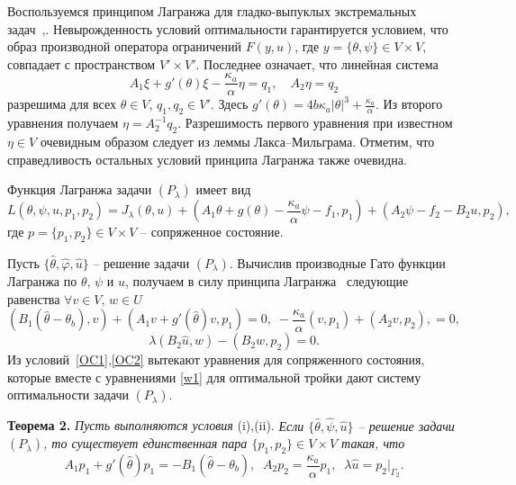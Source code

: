 \documentclass[12pt]{article}
\begin{document}
    Воспользуемся принципом
    Лагранжа для гладко-выпуклых экстремальных задач~\cite{10},\cite{11}. Невырожденность условий оптимальности гарантируется условием, что
    образ производной
    оператора ограничений $F(y, u)$, где $y=\{\theta,\psi\}\in V\times V$,
    совпадает с пространством $V'\times V'.$  Последнее означает, что
    линейная система
    \[
        A_1\xi+g'(\theta)\xi-\frac{\kappa_a}{\alpha}\eta=q_1,\quad
        A_2\eta=q_2
    \]
    разрешима для всех $\theta\in V$, $q_1,q_2\in V'$.
    Здесь $g'(\theta)=4b\kappa_a|\theta|^3+\frac{\kappa_a}{\alpha}$.
    Из второго уравнения получаем $\eta=A_2^{-1}q_2$.
    Разрешимость первого уравнения при известном $\eta\in V$ очевидным образом следует из
    леммы Лакса--Мильграма.
    Отметим, что справедливость остальных условий принципа Лагранжа также очевидна.

    Функция Лагранжа задачи $(P_\lambda)$
    имеет вид
    \[
        L(\theta, \psi, u, p_1, p_2) = J_\lambda(\theta, u)
        + (A_1\theta+g(\theta)-\frac{\kappa_a}{\alpha}\psi-f_1 ,p_1)+
        (A_2\psi-f_2-B_2u,p_2),
    \]
    где $p=\{p_1,p_2\}\in V\times V$ -- сопряженное состояние.

    Пусть $\{\hat{\theta}, \hat{\varphi}, \hat{u} \}$ -- решение задачи $(P_\lambda)$.
    Вычислив производные Гато функции Лагранжа по $\theta,\,\psi$ и $u$, получаем
    в силу принципа Лагранжа~\cite[Теорема 1.5]{10} следующие равенства
    $\forall v\in V,\, w\in U$
    \begin{equation}
        \label{OC1}
        (B_1(\hat{\theta} -\theta_b), v) + (A_1v+g'(\hat{\theta})v,p_1)=0,\;
        -\frac{\kappa_a}{\alpha}(v ,p_1)+
        (A_2v,p_2),    = 0,
    \end{equation}
    \begin{equation}
        \label{OC2}
        \lambda(B_2\hat{u},w) - (B_2w, p_2) = 0.
    \end{equation}
    Из условий~\eqref{OC1},\eqref{OC2} вытекают уравнения для сопряженного состояния, которые вместе с уравнениями \eqref{w1}
    для оптимальной тройки дают систему оптимальности задачи $(P_\lambda)$.

    \textbf{Теорема 2.}
    \textit{ Пусть выполняются условия} (i),(ii).
    \textit{ Если $\{\hat{\theta}, \hat{\psi}, \hat{u}\}$ -- решение
    задачи $(P_\lambda)$, то существует единственная пара $\{p_1, p_2 \} \in V\times V$
        такая, что}
    \begin{equation}
        \label{AS}
        A_1p_1+g'(\hat{\theta}) p_1=-B_1(\hat{\theta} -\theta_b),\;\;
        A_2p_2=\frac{\kappa_a}{\alpha}p_1,\;\;
        \lambda\hat{u}=p_2|_{\Gamma_2}.
    \end{equation}
\end{document}
